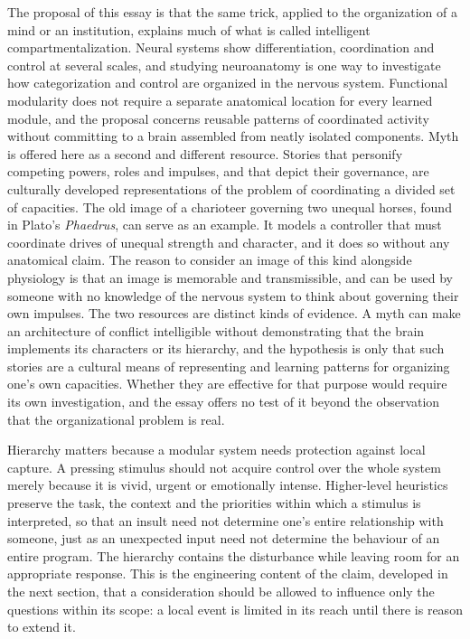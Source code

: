 \documentclass[12pt, a4paper]{article}
\begin{document}
The proposal of this essay is that the same trick, applied to the organization of a mind or an institution, explains much of what is called intelligent compartmentalization. Neural systems show differentiation, coordination and control at several scales, and studying neuroanatomy is one way to investigate how categorization and control are organized in the nervous system. Functional modularity does not require a separate anatomical location for every learned module, and the proposal concerns reusable patterns of coordinated activity without committing to a brain assembled from neatly isolated components. Myth is offered here as a second and different resource. Stories that personify competing powers, roles and impulses, and that depict their governance, are culturally developed representations of the problem of coordinating a divided set of capacities. The old image of a charioteer governing two unequal horses, found in Plato's \textit{Phaedrus}, can serve as an example. It models a controller that must coordinate drives of unequal strength and character, and it does so without any anatomical claim. The reason to consider an image of this kind alongside physiology is that an image is memorable and transmissible, and can be used by someone with no knowledge of the nervous system to think about governing their own impulses. The two resources are distinct kinds of evidence. A myth can make an architecture of conflict intelligible without demonstrating that the brain implements its characters or its hierarchy, and the hypothesis is only that such stories are a cultural means of representing and learning patterns for organizing one's own capacities. Whether they are effective for that purpose would require its own investigation, and the essay offers no test of it beyond the observation that the organizational problem is real.

Hierarchy matters because a modular system needs protection against local capture. A pressing stimulus should not acquire control over the whole system merely because it is vivid, urgent or emotionally intense. Higher-level heuristics preserve the task, the context and the priorities within which a stimulus is interpreted, so that an insult need not determine one's entire relationship with someone, just as an unexpected input need not determine the behaviour of an entire program. The hierarchy contains the disturbance while leaving room for an appropriate response. This is the engineering content of the claim, developed in the next section, that a consideration should be allowed to influence only the questions within its scope: a local event is limited in its reach until there is reason to extend it.
\end{document}
